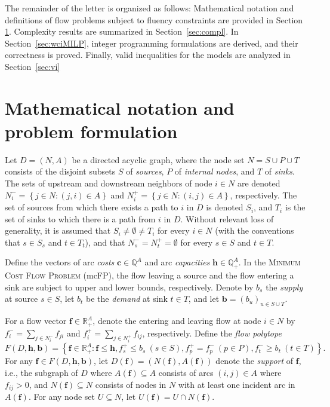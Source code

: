 \documentclass[pdflatex,sn-mathphys-num]{sn-jnl}%
\theoremstyle{thmstyleone}%
\begin{document}
The remainder of the letter is organized as follows:
Mathematical notation and definitions of flow problems subject to fluency constraints are provided in Section \ref{sec:problem}.
Complexity results are summarized in Section~\ref{sec:compl}.
In Section~\ref{sec:wciMILP}, integer programming formulations are derived, and their correctness is proved.
Finally, valid inequalities for the models are analyzed in Section~\ref{sec:vi}

\section{Mathematical notation and problem formulation}\label{sec:problem}

Let $D=(N,A)$ be a directed acyclic graph,
where the node set $N=S\cup P\cup T$ consists of the disjoint subsets $S$ of \emph{sources}, $P$ of \emph{internal nodes}, and $T$ of \emph{sinks}.
The sets of upstream and downstream neighbors of node $i\in N$ are denoted
$N_i^-=\left\{j\in N:(j,i)\in A\right\}$ and $N_i^+=\left\{j\in N:(i,j)\in A\right\}$, respectively.
The set of sources from which there exists a path to $i$ in $D$ is denoted $S_i$,
and $T_i$ is the set of sinks to which there is a path from $i$ in $D$.
Without relevant loss of generality, it is assumed that $S_i\neq\emptyset\neq T_i$ for every $i\in N$
(with the conventions that $s\in S_s$ and $t\in T_t$),
and that $N_s^-=N_t^+=\emptyset$ for every $s\in S$ and $t\in T$.

Define the vectors of arc \emph{costs} $\boldsymbol{c}\in\mathbb{Q}^{A}$ and arc \emph{capacities} $\boldsymbol{h}\in\mathbb{Q}_+^{A}$.
In the \textsc{Minimum Cost Flow Problem} (mcFP), the flow leaving a source and the flow entering a sink are subject to upper and lower bounds, respectively.
Denote by $b_s$ the \emph{supply} at source $s\in S$, let $b_t$ be the \emph{demand} at sink $t\in T$,
and let $\boldsymbol{b}=\left(b_u\right)_{u\in S\cup T}$.

For a flow vector $\boldsymbol{f}\in\mathbb{R}_+^A$, denote the entering and leaving flow at node $i\in N$ by
$f_i^-=\sum_{j\in N_i^-}f_{ji}$ and $f_i^+=\sum_{j\in N_i^+}f_{ij}$, respectively. Define the \emph{flow polytope}
\[F(D,\boldsymbol{h},\boldsymbol{b}) = \left\{\boldsymbol{f}\in\mathbb{R}_+^A:\boldsymbol{f}\leq\boldsymbol{h}, f_s^+\leq b_s ~(s\in S), f_p^+=f_p^- ~(p\in P), f_t^-\geq b_t ~(t\in T)\right\}.\]
For any $\boldsymbol{f}\in F(D,\boldsymbol{h},\boldsymbol{b})$, let $D(\boldsymbol{f})=\left(N(\boldsymbol{f}), A(\boldsymbol{f})\right)$ denote the
\emph{support} of $\boldsymbol{f}$, i.e., the subgraph of $D$
where $A(\boldsymbol{f})\subseteq A$ consists of arcs $(i,j)\in A$ where $f_{ij}>0$, and
$N(\boldsymbol{f})\subseteq N$ consists of nodes in $N$ with at least one incident arc in $A(\boldsymbol{f})$.
For any node set $U\subseteq N$, let $U(\boldsymbol{f})=U\cap N(\boldsymbol{f})$.
\end{document}
